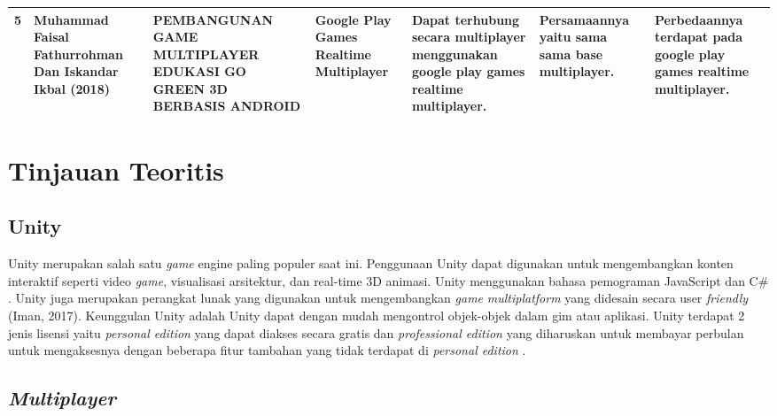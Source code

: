 \begin{landscape}
\begin{center}
\begin{longtable}{| c | L{3cm} | L{4cm} | L{2.5cm} | L{4cm} | L{3cm} | L{3cm} |}
	5 	& Muhammad Faisal Fathurrohman Dan Iskandar Ikbal (2018) \cite{gogreen}
		& PEMBANGUNAN GAME MULTIPLAYER EDUKASI GO GREEN 3D BERBASIS ANDROID 
		& Google Play Games Realtime Multiplayer
		& Dapat terhubung secara multiplayer menggunakan google play games realtime multiplayer.
		&Persamaannya yaitu sama sama base multiplayer.
		&Perbedaannya terdapat pada google play games realtime multiplayer.
		\\ \hline
			  
	\end{longtable}
	\end{center}
	\end{landscape}

\section{Tinjauan Teoritis}
\subsection{Unity}
\noindent

Unity merupakan salah satu \textit{game} engine paling populer saat ini. Penggunaan Unity dapat digunakan untuk mengembangkan konten interaktif seperti video \textit{game}, 
visualisasi arsitektur, dan real-time 3D animasi. Unity menggunakan bahasa pemograman JavaScript dan 
C\# \cite{Ansori}. Unity juga merupakan perangkat lunak yang digunakan untuk mengembangkan \textit{game} \textit{multiplatform} yang didesain secara user \textit{friendly} 
(Iman, 2017). Keunggulan Unity adalah Unity 
dapat dengan mudah mengontrol objek-objek 
dalam gim atau aplikasi. Unity terdapat 2 jenis 
lisensi yaitu \textit{personal edition} yang dapat diakses 
secara gratis dan \textit{professional edition} yang 
diharuskan untuk membayar perbulan untuk 
mengaksesnya dengan beberapa fitur tambahan 
yang tidak terdapat di \textit{personal edition} \cite{Sarwodi}. 

\subsection{\textit{Multiplayer}}
\noindent

